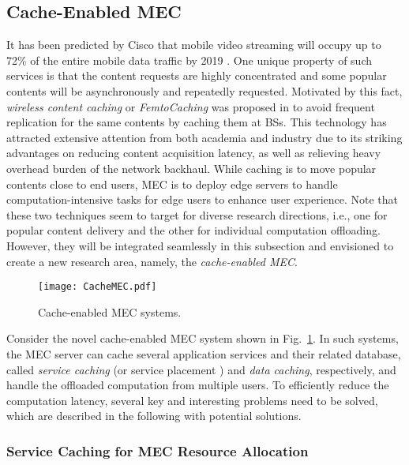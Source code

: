 \documentclass[journal]{IEEEtran}
\begin{document}
{%
\subsection{Cache-Enabled MEC}


It has been predicted by Cisco that mobile video streaming will occupy up to 72\% of the entire mobile data traffic by 2019 \cite{index2013global}. One unique property of such services is that the content requests are highly concentrated and some popular contents will be asynchronously and repeatedly requested. Motivated by this fact, \emph{wireless content caching} or \emph{FemtoCaching} was proposed in \cite{wang2014cache,bastug2014living,golrezaei2012femtocaching,gomes2017edge} to avoid frequent replication for the same contents by caching them at BSs. This technology has attracted extensive attention from both academia and industry due to its striking advantages on reducing content acquisition latency, as well as relieving heavy overhead burden of the network backhaul. While caching is to move popular contents close to end users, MEC is to deploy edge servers to handle computation-intensive tasks for edge users to enhance user experience. Note that these two techniques seem to target for diverse research directions, i.e., one for popular content delivery and the other for individual computation offloading. However, they will be integrated seamlessly in this subsection and envisioned to create a new research area, namely, the \emph{cache-enabled MEC}.

\begin{figure}[!t]
\begin{center}
   \texttt{[image: CacheMEC.pdf]}
\end{center}
\caption{Cache-enabled MEC systems.}
\label{FigCacheMEC}
\end{figure}
Consider the novel cache-enabled MEC system shown in Fig.~\ref{FigCacheMEC}. In such systems, the MEC server can cache several application services and their related database, called \emph{service caching} (or service placement \cite{yang2016cost}) and \emph{data caching}, respectively, and handle the offloaded computation from multiple users. To efficiently reduce the computation latency, several key and interesting problems need to be solved, which are described in the following with potential solutions.

\subsubsection{\textbf{Service Caching for MEC Resource Allocation}}

}
\end{document}
